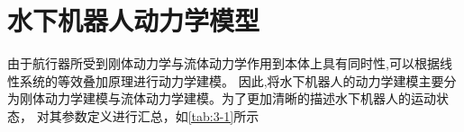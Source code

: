 \section{水下机器人动力学模型}
由于航行器所受到刚体动力学与流体动力学作用到本体上具有同时性,可以根据线性系统的等效叠加原理进行动力学建模\cite{ref27}。
因此,将水下机器人的动力学建模主要分为刚体动力学建模与流体动力学建模\cite{ref26}。为了更加清晰的描述水下机器人的运动状态，
对其参数定义进行汇总，如\autoref{tab:3-1}所示
\begin{table}[H]
    \fangsong
    \caption{\label{tab:3-1}水下机器人运动参数定义}
    \small %
    \centering%
    \renewcommand{\arraystretch}{1.5}
\end{table}
